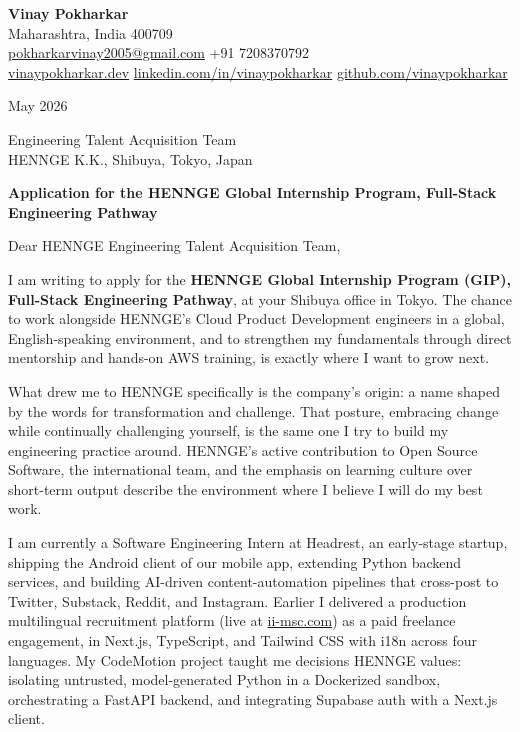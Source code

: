 \documentclass[11pt, letterpaper]{article}
\begin{document}
\begin{flushleft}
    {\fontsize{20pt}{20pt}\selectfont\textbf{Vinay Pokharkar}}\\[4pt]
    Maharashtra, India 400709\\
    \href{mailto:pokharkarvinay2005@gmail.com}{pokharkarvinay2005@gmail.com} \textbar{} +91 7208370792\\
    \href{https://vinaypokharkar.dev/}{vinaypokharkar.dev} \textbar{} \href{https://linkedin.com/in/vinaypokharkar}{linkedin.com/in/vinaypokharkar} \textbar{} \href{https://github.com/vinaypokharkar}{github.com/vinaypokharkar}
\end{flushleft}

\vspace{0.25cm}

May 2026

\vspace{0.15cm}

\begin{flushleft}
    Engineering Talent Acquisition Team\\
    HENNGE K.K., Shibuya, Tokyo, Japan
\end{flushleft}

\vspace{0.15cm}

\textbf{Application for the HENNGE Global Internship Program, Full-Stack Engineering Pathway}

\vspace{0.15cm}

Dear HENNGE Engineering Talent Acquisition Team,

I am writing to apply for the \textbf{HENNGE Global Internship Program (GIP), Full-Stack Engineering Pathway}, at your Shibuya office in Tokyo. The chance to work alongside HENNGE's Cloud Product Development engineers in a global, English-speaking environment, and to strengthen my fundamentals through direct mentorship and hands-on AWS training, is exactly where I want to grow next.

What drew me to HENNGE specifically is the company's origin: a name shaped by the words for transformation and challenge. That posture, embracing change while continually challenging yourself, is the same one I try to build my engineering practice around. HENNGE's active contribution to Open Source Software, the international team, and the emphasis on learning culture over short-term output describe the environment where I believe I will do my best work.

I am currently a Software Engineering Intern at Headrest, an early-stage startup, shipping the Android client of our mobile app, extending Python backend services, and building AI-driven content-automation pipelines that cross-post to Twitter, Substack, Reddit, and Instagram. Earlier I delivered a production multilingual recruitment platform (live at \href{https://ii-msc.com}{ii-msc.com}) as a paid freelance engagement, in Next.js, TypeScript, and Tailwind CSS with i18n across four languages. My CodeMotion project taught me decisions HENNGE values: isolating untrusted, model-generated Python in a Dockerized sandbox, orchestrating a FastAPI backend, and integrating Supabase auth with a Next.js client.
\end{document}
